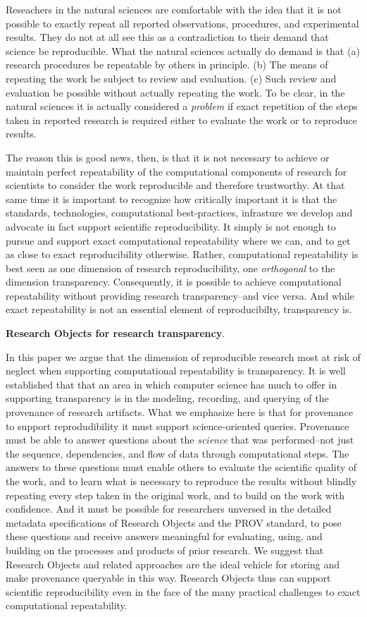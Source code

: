  Reseachers in the natural sciences are comfortable with the idea that it is not possible to exactly
	repeat all reported observations, procedures, and experimental results.
They do not at all see this as a contradiction to their demand that science be reproducible.
What the natural sciences actually do demand is that 
	(a) research procedures be repeatable by others in principle.
	(b) The means of repeating the work be subject to review and evaluation. 
	(c) Such review and evaluation be possible without actually repeating the work.
To be clear, in the natural sciences it is actually considered a \emph{problem} if exact repetition of the steps
	taken in reported research is required either to evaluate the work or to reproduce results.

The reason this is good news, then, is that it is not necessary to achieve or 
	maintain perfect repeatability of the computational components of research for scientists to 
	consider the work reproducible and therefore trustworthy.
At that same time it is important to recognize how critically important it is that the standards, technologies, 
	computational best-practices, infrasture we develop and advocate in fact support scientific reproducibility.
It simply is not enough to pursue and support exact computational repeatability where we can, and to get as close
	to exact reproducibility otherwise.
Rather, computational repeatability is best seen as one dimension of research reproducibility, one \emph{orthogonal} to 
	the dimension transparency.
Consequently, it is possible to achieve computational repeatability without providing research transparency--and vice versa.
And while exact repeatability is not an essential element of reproducibilty, transparency is.

\textbf{Research Objects for research transparency}.

In this paper we argue that the dimension of reproducible research most at risk of neglect when supporting computational
	repeatability is transparency.
It is well established that that an area in which computer science has much to offer in supporting transparency is in the
	modeling, recording, and querying of the provenance of research artifacts.
What we emphasize here is that for provenance to support reprodudibility it must support science-oriented queries.
Provenance must be able to answer questions about the \emph{science} that was performed--not just the 
	sequence, dependencies, and flow of data through computational steps.
The answers to these questions must enable others to evaluate the scientific quality of the work, and to learn what is necessary to 
	reproduce the results without blindly repeating every step taken in the original work, and to build on the work
	with confidence.
And it must be possible for researchers unversed in the detailed metadata specifications of Research Objects and the PROV standard,
	to pose these questions and receive answers meaningful for evaluating, using, and building on the
	processes and products of prior research.
We suggest that Research Objects and related approaches are the ideal vehicle for storing and make provenance queryable
	in this way.
Research Objects thus can support scientific reproducibility even in the face of the many practical challenges to exact 
	computational repeatability.
